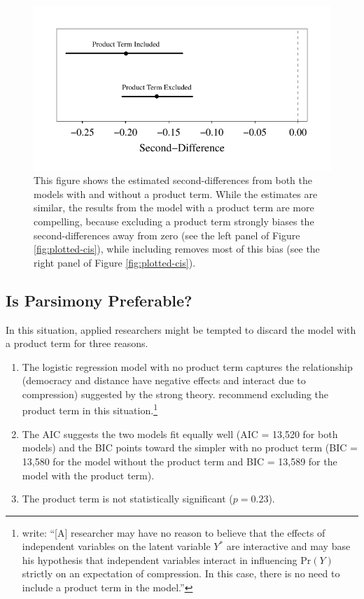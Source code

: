 \documentclass[12pt]{article}
\begin{document}
        \begin{figure}[h]
        \begin{center}
        \includegraphics[scale = .8]{fig/fig-sd-distance.pdf}
        \end{center}\caption{This figure shows the estimated second-differences from both the models with and without a product term. While the estimates are similar, the results from the model with a product term are more compelling, because excluding a product term strongly biases the second-differences away from zero (see the left panel of Figure \ref{fig:plotted-cis}), while including removes most of this bias (see the right panel of Figure \ref{fig:plotted-cis}). }\label{fig:sd-distance}
        \end{figure}

\subsection*{Is Parsimony Preferable?}

In this situation, applied researchers might be tempted to discard the model with a product term for three reasons.
\singlespace\vspace{-3mm}
\begin{enumerate}
\item The logistic regression model with no product term captures the relationship (democracy and distance have negative effects and interact due to compression) suggested by the strong theory. \cite{BerryDeMerittEsarey2010} recommend excluding the product term in this situation.\footnote{\cite{BerryDeMerittEsarey2010} write: ``[A] researcher may have no reason to believe that the effects of independent variables on the latent variable $Y^*$ are interactive and may base his hypothesis that independent variables interact in influencing $\text{Pr}(Y)$ strictly on an expectation of compression. In this case, there is no need to include a product term in the model.''}
\item The AIC suggests the two models fit equally well (AIC = 13,520 for both models) and the BIC points toward the simpler with no product term (BIC = 13,580 for the model without the product term and BIC = 13,589 for the model with the product term). 
\item The product term is not statistically significant ($p = 0.23$). 
\end{enumerate}
\doublespace
\end{document}
